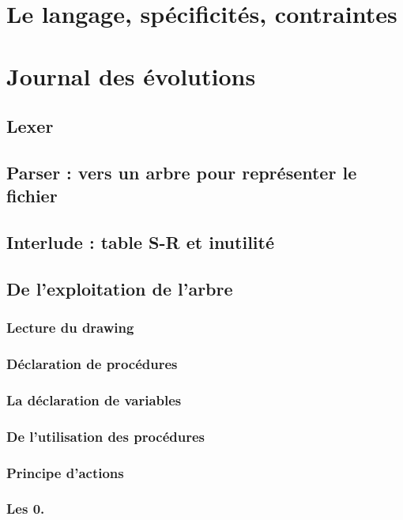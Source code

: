 \documentclass[11pt]{report} %
\begin{document}
\chapter{Le langage, spécificités, contraintes} %

\appendix

\chapter{Journal des évolutions}
\section{Lexer}
\section{Parser : vers un arbre pour représenter le fichier}
\section{Interlude : table S-R et inutilité}

\section{De l'exploitation de l'arbre}
\subsection{Lecture du drawing}%
\subsection{Déclaration de procédures}
\subsection{La déclaration de variables} %
\subsection{De l'utilisation des procédures}%
\subsection{Principe d'actions} %
\subsection{Les 0.}
\end{document}
